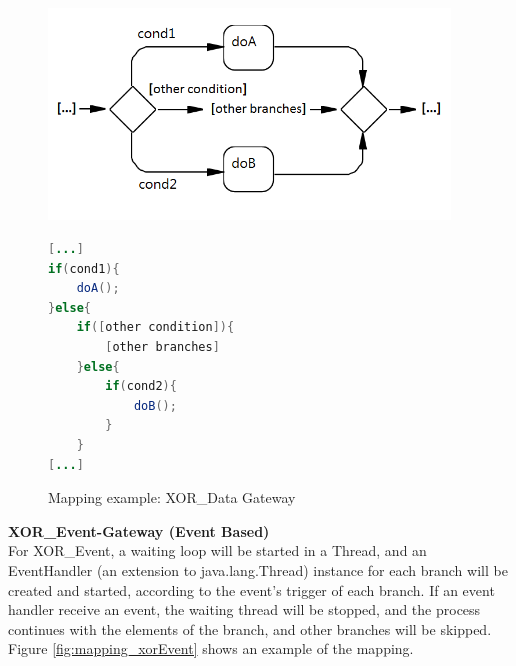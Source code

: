 \begin{figure}[h]
\begin{minipage}[c]{0.5\textwidth}
\includegraphics[width=0.95\textwidth]{images/mapping/xor-data.png}
\end{minipage}
\begin{minipage}[c]{0.5\textwidth}
\begin{lstlisting}[language=Java]
[...]
if(cond1){
	doA();
}else{
	if([other condition]){
		[other branches]
	}else{
		if(cond2){
			doB();
		}
	}
[...]
\end{lstlisting}
\end{minipage}
\caption{Mapping example: XOR\_Data Gateway}%
\label{fig:mapping_xorData}%
\end{figure}

\textbf{XOR\_Event-Gateway (Event Based)}\\
For XOR\_Event, a waiting loop will be started in a Thread, and an EventHandler (an extension to java.lang.Thread) instance for each branch will be created and started, according to the event's trigger of each branch. If an event handler receive an event, the waiting thread will be stopped, and the process continues with the elements of the branch, and other branches will be skipped. Figure \ref{fig:mapping_xorEvent} shows an example of the mapping.

